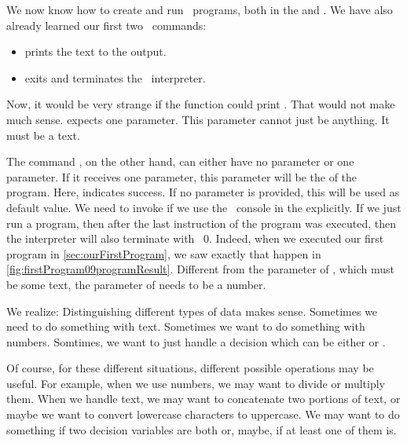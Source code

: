 %
%
We now know how to create and run \python\ programs, both in the  and .
We have also already learned our first two \python\ commands:%
%
\begin{itemize}%
\item {} prints the text  to the output.
\item {} exits and terminates the \python\ interpreter.%
\end{itemize}%
%
Now, it would be very strange if the  function could print .
That would not make much sense.
 expects one parameter.
This parameter cannot just be anything.
It must be a text.

The command , on the other hand, can either have no parameter or one parameter.
If it receives one parameter, this parameter will be the  of the program.
Here,  indicates success.
If no parameter is provided, this will be used as default value.
We need to invoke  if we use the \python\ console in the  explicitly.
If we just run a program, then after the last instruction of the program was executed, then the interpreter will also terminate with ~0.
Indeed, when we executed our first program in \cref{sec:ourFirstProgram}, we saw exactly that happen in \cref{fig:firstProgram09programResult}.
Different from the parameter of , which must be some text, the parameter of  needs to be a number.

We realize:
Distinguishing different types of data makes sense.
Sometimes we need to do something with text.
Sometimes we want to do something with numbers.
Somtimes, we want to just handle a decision which can be either  or .

Of course, for these different situations, different possible operations may be useful.
For example, when we use numbers, we may want to divide or multiply them.
When we handle text, we may want to concatenate two portions of text, or maybe we want to convert lowercase characters to uppercase.
We may want to do something if two decision variables are both  or, maybe, if at least one of them is.


